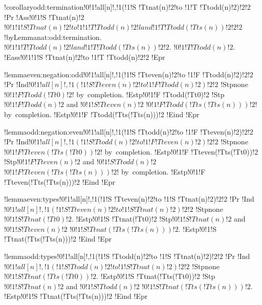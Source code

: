 !corollary{odd:termination}{!0!1!all[n]!,!1(!1!S !Tt{nat}(n)!2!to !1!T !Tt{odd}(n)!2)!2!2}
!Pr{
!Ass{!0!1!S !Tt{nat}(n)!2}
$!0!1!1!S !Tt{nat}(n)!2!to !1!1!T !Tt{odd}(n)!2!land !1!T !Tt{odd}(!Tt{s}(n))!2!2!2$!by{Lemma}{nat:odd:termination}.
$!0!1!1!T !Tt{odd}(n)!2!land !1!T !Tt{odd}(!Tt{s}(n))!2!2$.
$!0!1!T !Tt{odd}(n)!2$.
!Eass{!0!1!1!S !Tt{nat}(n)!2!to !1!T !Tt{odd}(n)!2!2}}
!Epr

!lemma{even:negation:odd}{!0!1!all[n]!,!1(!1!S !Tt{even}(n)!2!to !1!F !Tt{odd}(n)!2)!2!2}
!Pr{
!Ind{$!0!1!all[n]!,!1(!1!S !Tt{even}(n)!2!to !1!F !Tt{odd}(n)!2)!2!2$}
!Stp{none}
$!0!1!F !Tt{odd}(!Tt{0})!2$! by~completion.
!Estp{!0!1!F !Tt{odd}(!Tt{0})!2}
!Stp{$!0!1!F !Tt{odd}(n)!2$ and $!0!1!S !Tt{even}(n)!2$}
$!0!1!F !Tt{odd}(!Tt{s}(!Tt{s}(n)))!2$! by~completion.
!Estp{!0!1!F !Tt{odd}(!Tt{s}(!Tt{s}(n)))!2}
!Eind}
!Epr

!lemma{odd:negation:even}{!0!1!all[n]!,!1(!1!S !Tt{odd}(n)!2!to !1!F !Tt{even}(n)!2)!2!2}
!Pr{
!Ind{$!0!1!all[n]!,!1(!1!S !Tt{odd}(n)!2!to !1!F !Tt{even}(n)!2)!2!2$}
!Stp{none}
$!0!1!F !Tt{even}(!Tt{s}(!Tt{0}))!2$! by~completion.
!Estp{!0!1!F !Tt{even}(!Tt{s}(!Tt{0}))!2}
!Stp{$!0!1!F !Tt{even}(n)!2$ and $!0!1!S !Tt{odd}(n)!2$}
$!0!1!F !Tt{even}(!Tt{s}(!Tt{s}(n)))!2$! by~completion.
!Estp{!0!1!F !Tt{even}(!Tt{s}(!Tt{s}(n)))!2}
!Eind}
!Epr

!lemma{even:types}{!0!1!all[n]!,!1(!1!S !Tt{even}(n)!2!to !1!S !Tt{nat}(n)!2)!2!2}
!Pr{
!Ind{$!0!1!all[n]!,!1(!1!S !Tt{even}(n)!2!to !1!S !Tt{nat}(n)!2)!2!2$}
!Stp{none}
$!0!1!S !Tt{nat}(!Tt{0})!2$.
!Estp{!0!1!S !Tt{nat}(!Tt{0})!2}
!Stp{$!0!1!S !Tt{nat}(n)!2$ and $!0!1!S !Tt{even}(n)!2$}
$!0!1!S !Tt{nat}(!Tt{s}(!Tt{s}(n)))!2$.
!Estp{!0!1!S !Tt{nat}(!Tt{s}(!Tt{s}(n)))!2}
!Eind}
!Epr

!lemma{odd:types}{!0!1!all[n]!,!1(!1!S !Tt{odd}(n)!2!to !1!S !Tt{nat}(n)!2)!2!2}
!Pr{
!Ind{$!0!1!all[n]!,!1(!1!S !Tt{odd}(n)!2!to !1!S !Tt{nat}(n)!2)!2!2$}
!Stp{none}
$!0!1!S !Tt{nat}(!Tt{s}(!Tt{0}))!2$.
!Estp{!0!1!S !Tt{nat}(!Tt{s}(!Tt{0}))!2}
!Stp{$!0!1!S !Tt{nat}(n)!2$ and $!0!1!S !Tt{odd}(n)!2$}
$!0!1!S !Tt{nat}(!Tt{s}(!Tt{s}(n)))!2$.
!Estp{!0!1!S !Tt{nat}(!Tt{s}(!Tt{s}(n)))!2}
!Eind}
!Epr

